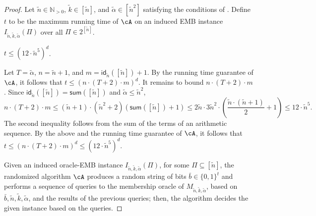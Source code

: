 \begin{proof}
		
		Let $\tilde{n} \in \mathbb{N}_{>0}$, $\tilde{k} \in \left[\tilde{n}\right]$, and $\tilde{\alpha} \in \left[\tilde{n}^2\right]$  satisfying the conditions of . Define $t$ to be the maximum running time of $\cA$ on an induced EMB instance $I_{\tilde{n},\tilde{k},\tilde{\alpha}}(\Pi)$ over all $\Pi \in 2^{\left[ \tilde{n}\right]}$. 
			\begin{claim}
			\label{claim:H2}
			$t \leq	\left(	12 \cdot \tilde{n}^5 \right)^{d}$.    
		\end{claim}
		\begin{claimproof}
				Let $T = \tilde{\alpha}$, $n = \tilde{n}+1$, and $m = \textsf{id}_{\tilde{n}}(\left[\tilde{n}\right])+1$. By the running time guarantee of $\cA$, it follows that $t \leq	\left(	n \cdot (T+2) \cdot m \right)^{d}$. It remains to bound $n \cdot (T+2) \cdot m$. Since $\textsf{id}_{\tilde{n}}(\left[\tilde{n}\right]) = \textsf{sum}(\left[\tilde{n}\right])$ and $\tilde{\alpha} \leq \tilde{n}^2$, %
				 \begin{equation*}
				\label{eq:InducedParameters}
				n  \cdot (T+2) \cdot m \leq	 \left(\tilde{n}+1\right) \cdot \left( \tilde{n}^2+2\right)\left( \textsf{sum}( \left[\tilde{n} \right])+1 \right) \leq 2 \tilde{n} \cdot 3 \tilde{n}^2 \cdot \left(\frac{\tilde{n} \cdot (\tilde{n}+1)}{2}+1 \right) \leq 12 \cdot \tilde{n}^5. 
			\end{equation*}  The second inequality follows from the sum of the terms of an arithmetic sequence. By the above and the running time guarantee of $\cA$, it follows that $t \leq	\left(	n \cdot (T+2) \cdot m \right)^{d} \leq 	\left(	12 \cdot \tilde{n}^5 \right)^{d}$.   
		\end{claimproof}
		
	Given  an induced oracle-EMB instance $I_{\tilde{n},\tilde{k},\tilde{\alpha}}(\Pi)$, for some $\Pi \subseteq \left[ \tilde{n}\right]$,  the randomized algorithm $\cA$ produces a random string of bits $\bar{b} \in \{0,1\}^{t}$ and performs a sequence of queries to the membership oracle of $M_{\tilde{n},\tilde{k},\tilde{\alpha}}$, based on $\bar{b},\tilde{n},\tilde{k},\tilde{\alpha}$, and the results of the previous queries; then, the algorithm decides the given instance based on the queries. 
		 

\end{proof}
